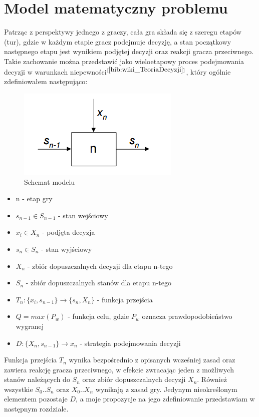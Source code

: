 \section{Model matematyczny problemu}
Patrząc z perspektywy jednego z graczy, cała gra składa się z szeregu etapów (tur), gdzie w każdym etapie gracz podejmuje decyzję, a stan początkowy następnego etapu jest wynikiem podjętej decyzji oraz reakcji gracza przeciwnego. Takie zachowanie można przedstawić jako wieloetapowy proces podejmowania decyzji w warunkach niepewności$^{[\ref{bib:wiki_TeoriaDecyzji}]}$, który ogólnie zdefiniowałem następująco: 

\clearpage
\begin{figure}[h]  %
	\centering
	\includegraphics[]{Resources/Schemat_Modelu.png}
	\caption{Schemat modelu} \label{fig:Schemat_Modelu}
\end{figure}
\begin{itemize}
	\item n - etap gry
	\item $s_{n-1} \in S_{n-1}$ - stan wejściowy
	\item $x_i \in X_n$ - podjęta decyzja
	\item $s_{n} \in S_n$ - stan wyjściowy
	\item $X_n$ - zbiór dopuszczalnych decyzji dla etapu n-tego
	\item $S_n$ - zbiór dopuszczalnych stanów dla etapu n-tego
	\item $T_n: \{x_i, s_{n-1} \} \rightarrow \{s_n, X_n\}$ - funkcja przejścia
	\item $Q = max(P_w)$ - funkcja celu, gdzie $P_w$ oznacza prawdopodobieństwo wygranej
	\item $D: \{X_n, s_{n-1}\} \rightarrow x_n$ - strategia podejmowania decyzji
\end{itemize}
Funkcja przejścia $T_n$ wynika bezpośrednio z opisanych wcześniej zasad oraz zawiera reakcję gracza przeciwnego, w efekcie zwracając jeden z możliwych stanów należących do $S_n$ oraz zbiór dopuszczalnych decyzji $X_n$. Również wszystkie $S_0 .. S_n$ oraz $X_0 .. X_n$ wynikają z zasad gry. Jedynym nieokreślonym elementem pozostaje $D$, a moje propozycje na jego zdefiniowanie przedstawiam w następnym rozdziale.